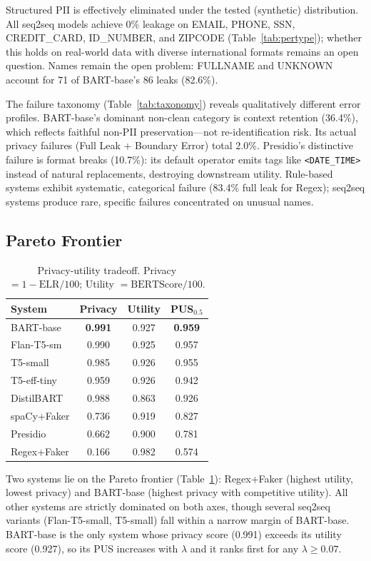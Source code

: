 \documentclass[10pt,twocolumn]{article}
\begin{document}
Structured PII is effectively eliminated under the tested (synthetic) distribution.
All seq2seq models achieve 0\% leakage on EMAIL, PHONE, SSN, CREDIT\_CARD, ID\_NUMBER, and ZIPCODE (Table~\ref{tab:pertype}); whether this holds on real-world data with diverse international formats remains an open question.
Names remain the open problem: FULLNAME and UNKNOWN account for 71 of BART-base's 86 leaks (82.6\%).

The failure taxonomy (Table~\ref{tab:taxonomy}) reveals qualitatively different error profiles.
BART-base's dominant non-clean category is context retention (36.4\%), which reflects faithful non-PII preservation---not re-identification risk.
Its actual privacy failures (Full Leak + Boundary Error) total 2.0\%.
Presidio's distinctive failure is format breaks (10.7\%): its default operator emits tags like \texttt{<DATE\_TIME>} instead of natural replacements, destroying downstream utility.
Rule-based systems exhibit systematic, categorical failure (83.4\% full leak for Regex); seq2seq systems produce rare, specific failures concentrated on unusual names.

\subsection{Pareto Frontier}\label{sec:res-pareto}

\begin{table}[t]
\centering
\caption{Privacy-utility tradeoff. Privacy $= 1 - \text{ELR}/100$; Utility $= \text{BERTScore}/100$.}\label{tab:pareto}
\small
\begin{tabular}{@{}lccc@{}}
\toprule
System & Privacy & Utility & PUS$_{0.5}$ \\
\midrule
BART-base & \textbf{0.991} & 0.927 & \textbf{0.959} \\
Flan-T5-sm & 0.990 & 0.925 & 0.957 \\
T5-small & 0.985 & 0.926 & 0.955 \\
T5-eff-tiny & 0.959 & 0.926 & 0.942 \\
DistilBART & 0.988 & 0.863 & 0.926 \\
spaCy+Faker & 0.736 & 0.919 & 0.827 \\
Presidio & 0.662 & 0.900 & 0.781 \\
Regex+Faker & 0.166 & 0.982 & 0.574 \\
\bottomrule
\end{tabular}
\end{table}

Two systems lie on the Pareto frontier (Table~\ref{tab:pareto}): Regex+Faker (highest utility, lowest privacy) and BART-base (highest privacy with competitive utility).
All other systems are strictly dominated on both axes, though several seq2seq variants (Flan-T5-small, T5-small) fall within a narrow margin of BART-base.
BART-base is the only system whose privacy score (0.991) exceeds its utility score (0.927), so its PUS increases with $\lambda$ and it ranks first for any $\lambda \geq 0.07$.
\end{document}
